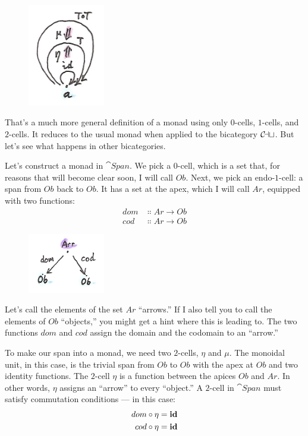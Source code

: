 \begin{figure}[H]
\centering
\includegraphics[width=0.3\textwidth]{images/bimonad.png}
\end{figure}

\noindent
That's a much more general definition of a monad using only $0$-cells,
$1$-cells, and $2$-cells. It reduces to the usual monad when applied to the
bicategory $\mathcal{C\mkern-3mu at}$. But let's see what happens in other
bicategories.

Let's construct a monad in $\cat{Span}$. We pick a $0$-cell, which is a
set that, for reasons that will become clear soon, I will call
$Ob$. Next, we pick an endo-$1$-cell: a span from $Ob$ back
to $Ob$. It has a set at the apex, which I will call $Ar$,
equipped with two functions:
\begin{align*}
dom &\Colon Ar \to Ob \\
cod &\Colon Ar \to Ob
\end{align*}

\begin{figure}[H]
\centering
\includegraphics[width=0.3\textwidth]{images/spanmonad.png}
\end{figure}

\noindent
Let's call the elements of the set $Ar$ ``arrows.'' If I also
tell you to call the elements of $Ob$ ``objects,'' you might get
a hint where this is leading to. The two functions $dom$ and
$cod$ assign the domain and the codomain to an ``arrow.''

To make our span into a monad, we need two $2$-cells, $\eta$ and
$\mu$. The monoidal unit, in this case, is the trivial span from
$Ob$ to $Ob$ with the apex at $Ob$ and two identity
functions. The $2$-cell $\eta$ is a function between the apices
$Ob$ and $Ar$. In other words, $\eta$ assigns an
``arrow'' to every ``object.'' A $2$-cell in $\cat{Span}$ must satisfy
commutation conditions --- in this case:
\begin{align*}
dom &\circ \eta = \mathbf{id} \\
cod &\circ \eta = \mathbf{id}
\end{align*}

